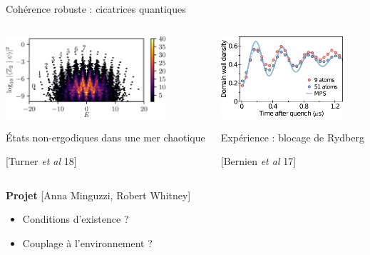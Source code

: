 \begin{frame}{Cohérence robuste : cicatrices quantiques}
\begin{columns}
	\begin{column}{0.5\textwidth}
		\centering
		\includegraphics[height=3cm]{img/2_projet_recherche/scars_spin_polarization}
		
		États non-ergodiques dans une mer chaotique
		
		\footnotesize{[Turner \emph{et al} 18]}
	\end{column}
	\begin{column}{0.5\textwidth}
		\centering
		\includegraphics[height=3cm]{img/2_projet_recherche/scars_DW_density}
		
		Expérience : blocage de Rydberg
		
		\footnotesize{[Bernien \emph{et al} 17]}
	\end{column}
\end{columns}
\begin{block}{\textbf{Projet} [Anna Minguzzi, Robert Whitney]}
	\begin{itemize}
		\item Conditions d'existence ?
		\item Couplage à l'environnement ?
	\end{itemize}
\end{block}
\end{frame}

